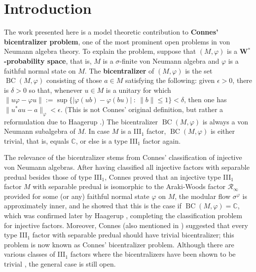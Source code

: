 \documentclass[12pt]{amsart}
\theoremstyle{definition}
\newcommand{\C}{\mathbb{C}}
\def\bb{\mathbb}
\def\bb{\mathbb}
\def\BC{\operatorname{BC}}
\begin{document}
\maketitle

\tableofcontents

\section{Introduction}

The work presented here is a model theoretic contribution to \textbf{Connes' bicentralizer problem}, one of the most prominent open problems in von Neumann algebra theory.  To explain the problem, suppose that $(M,\varphi)$ is a \textbf{W$^*$-probability space}, that is, $M$ is a $\sigma$-finite von Neumann algebra and $\varphi$ is a faithful normal state on $M$.  The \textbf{bicentralizer} of $(M,\varphi)$ is the set $\BC(M,\varphi)$ consisting of those $a\in M$ satisfying the following:  given $\epsilon>0$, there is $\delta>0$ so that, whenever $u\in M$ is a unitary for which $\|u\varphi-\varphi u\|:=\sup\{|\varphi(ub)-\varphi(bu)| \ : \ \|b\|\leq 1\}<\delta$, then one has $\|u^*au-a\|_\varphi<\epsilon$.  (This is not Connes' original definition, but rather a reformulation due to Haagerup \cite[Section 1]{haagerup87}.)  The bicentralizer $\BC(M,\varphi)$ is always a von Neumann subalgebra of $M$.  In case $M$ is a III$_1$ factor, $\BC(M,\varphi)$ is either trivial, that is, equals $\bb C$, or else is a type III$_1$ factor again.  

The relevance of the bicentralizer stems from Connes' classification of injective von Neumann algebras.  After having classified all injective factors with separable predual besides those of type III$_1$, Connes proved that an injective type III$_1$ factor $M$ with separable predual is isomorphic to the Araki-Woods factor $\mathcal R_\infty$ provided for some (or any) faithful normal state $\varphi$ on $M$, the modular flow $\sigma^{\varphi}$ is approximately inner, and he showed that this is the case if $\BC(M,\varphi)=\C$, which was confirmed later by Haagerup \cite{haagerup87}, completing the classification problem for injective factors. 
Moreover, Connes \cite{Connes85} (also mentioned in \cite[Section 3]{haagerup87}) suggested that every type III$_1$ factor with separable predual should have trivial bicentralizer; this problem is now known as Connes' bicentralizer problem. Although there are various classes of III$_1$ factors where the bicentralizers have been shown to be trivial \cite{AHHM20,Bikram2024MixedQBicentralizer,haagerup87,Houdayer09freeArakiWoods,HoudayerIsono20bicentralizerqArakiWoods,HoudayerUeda16asymptotic,Marrakchi20,Marrakchi25Kadison}, the general case is still open.
\end{document}
